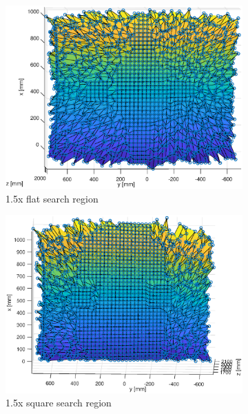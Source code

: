 \begin{figure}[h!]
	\centering
	\begin{subfigure}[t]{0.3\linewidth}
		\centering
		\includegraphics[width=1\linewidth]{figures/part2/scan2f}
		\caption{1.5x flat search region}
		\label{fig:scan_op_a}
	\end{subfigure}
	\begin{subfigure}[t]{0.3\linewidth}
		\centering
		\includegraphics[width=1\linewidth]{figures/part2/scan2}
		\caption{1.5x square search region}
		\label{fig:scan_op_b}
	\end{subfigure}
	\begin{subfigure}[t]{0.3\linewidth}
		\centering

\end{subfigure}
\end{figure}
